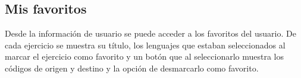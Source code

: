 \begin{itemize}
\begin{figure}[H]
\begin{center}
\end{center}
\end{figure}

\end{itemize}

\subsection{Mis favoritos}

Desde la información de usuario se puede acceder a los favoritos del usuario. De cada ejercicio se muestra su título, los lenguajes que estaban seleccionados al marcar el ejercicio como favorito y un botón que al seleccionarlo muestra los códigos de origen y destino y la opción de desmarcarlo como favorito.

\begin{figure}[H]
\begin{center}
\end{center}
\end{figure}

